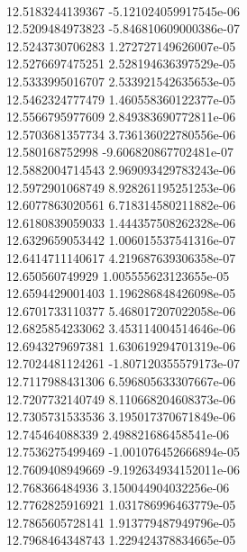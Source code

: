 { \\
12.5183244139367 -5.121024059917545e-06
 \\
12.5209484973823 -5.846810609000386e-07
 \\
12.5243730706283 1.272727149626007e-05
 \\
12.5276697475251 2.528194636397529e-05
 \\
12.5333995016707 2.533921542635653e-05
 \\
12.5462324777479 1.460558360122377e-05
 \\
12.5566795977609 2.849383690772811e-06
 \\
12.5703681357734 3.736136022780556e-06
 \\
12.580168752998 -9.606820867702481e-07
 \\
12.5882004714543 2.969093429783243e-06
 \\
12.5972901068749 8.928261195251253e-06
 \\
12.6077863020561 6.718314580211882e-06
 \\
12.6180839059033 1.444357508262328e-06
 \\
12.6329659053442 1.006015537541316e-07
 \\
12.6414711140617 4.219687639306358e-07
 \\
12.650560749929 1.005555623123655e-05
 \\
12.6594429001403 1.196286848426098e-05
 \\
12.6701733110377 5.468017207022058e-06
 \\
12.6825854233062 3.453114004514646e-06
 \\
12.6943279697381 1.630619294701319e-06
 \\
12.7024481124261 -1.807120355579173e-07
 \\
12.7117988431306 6.596805633307667e-06
 \\
12.7207732140749 8.110668204608373e-06
 \\
12.7305731533536 3.195017370671849e-06
 \\
12.745464088339 2.498821686458541e-06
 \\
12.7536275499469 -1.001076452666894e-05
 \\
12.7609408949669 -9.192634934152011e-06
 \\
12.768366484936 3.150044904032256e-06
 \\
12.7762825916921 1.031786996463779e-05
 \\
12.7865605728141 1.913779487949796e-05
 \\
12.7968464348743 1.229424378834665e-05
 \\
}

